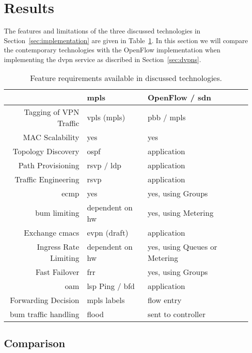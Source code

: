 \section{Results} %
\label{sec:results}

The features and limitations of the three discussed technologies in Section~\ref{sec:implementation} are given in Table~\ref{tb:reqs}. In this section we will compare the contemporary technologies with the OpenFlow implementation when implementing the \ac{dvpn} service as discribed in Section~\ref{sec:dvpns}.

\begin{table}[h]
	\centering
	\begin{tabular}{r|lll}
	 & \acs{mpls} & OpenFlow / \acs{sdn}\\
	\hline
	Tagging of VPN Traffic & \acs{vpls} (\acs{mpls}) & \acs{pbb} / \acs{mpls}\\
	MAC Scalability & yes & yes\\
	Topology Discovery & \acs{ospf} & application\\
	Path Provisioning & \acs{rsvp} / \acs{ldp} & application\\
	Traffic Engineering & \acs{rsvp} & application\\
	\ac{ecmp} & yes & yes, using Groups\\
	\ac{bum} limiting & dependent on \acs{hw} & yes, using Metering\\
	Exchange \acsp{cmac} & \ac{evpn} (draft) & application\\
	Ingress Rate Limiting & dependent on \acs{hw} & yes, using Queues or Metering\\
	Fast Failover & \acs{frr} & yes, using Groups\\
	\acs{oam} & \acs{lsp} Ping / \acs{bfd} & application\\
	\hline
	Forwarding Decision & \acs{mpls} labels & flow entry \\
	\ac{bum} traffic handling & flood & sent to controller\\
	\end{tabular}
	\caption{Feature requirements available in discussed technologies.}
	\label{tb:reqs}
\end{table}


\subsection{Comparison} %
\label{sub:comparison}

